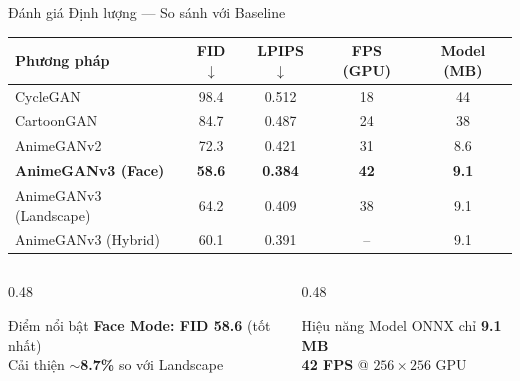 \documentclass[aspectratio=169,12pt]{beamer}
\begin{document}
\begin{frame}{Đánh giá Định lượng — So sánh với Baseline}
\begin{table}
\centering
\small
\begin{tabular}{lcccc}
\toprule
\textbf{Phương pháp} & \textbf{FID $\downarrow$} & \textbf{LPIPS $\downarrow$} & \textbf{FPS (GPU)} & \textbf{Model (MB)} \\
\midrule
CycleGAN & 98.4 & 0.512 & 18 & 44 \\
CartoonGAN & 84.7 & 0.487 & 24 & 38 \\
AnimeGANv2 & 72.3 & 0.421 & 31 & 8.6 \\
\rowcolor{lightblue} \textbf{AnimeGANv3 (Face)} & \textbf{58.6} & \textbf{0.384} & \textbf{42} & \textbf{9.1} \\
AnimeGANv3 (Landscape) & 64.2 & 0.409 & 38 & 9.1 \\
AnimeGANv3 (Hybrid) & 60.1 & 0.391 & -- & 9.1 \\
\bottomrule
\end{tabular}
\end{table}

\vspace{0.2cm}
\begin{columns}
\begin{column}{0.48\textwidth}
\begin{exampleblock}{\centering Điểm nổi bật}
\centering
\small
\textbf{Face Mode: FID 58.6} (tốt nhất)\\
Cải thiện \textbf{$\sim$8.7\%} so với Landscape
\end{exampleblock}
\end{column}
\begin{column}{0.48\textwidth}
\begin{block}{\centering Hiệu năng}
\centering
\small
Model ONNX chỉ \textbf{9.1 MB}\\
\textbf{42 FPS} @ $256\times256$ GPU
\end{block}
\end{column}
\end{columns}
\end{frame}
\end{document}
